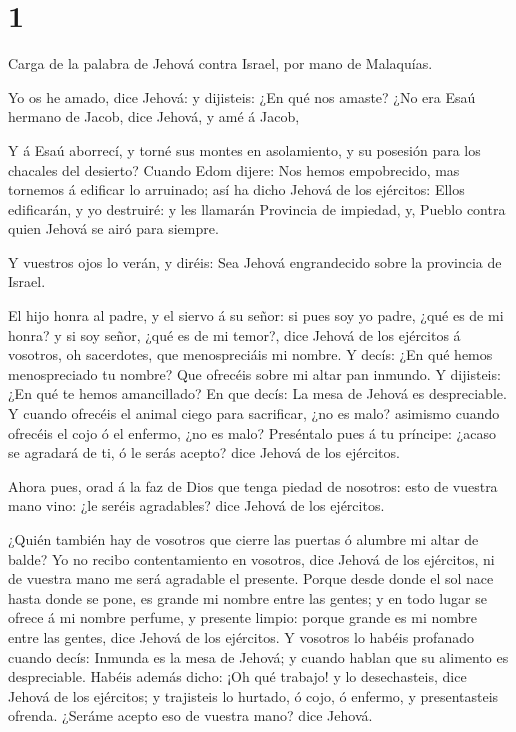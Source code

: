 \hypertarget{section}{%
\section{1}\label{section}}

 Carga de la palabra de Jehová contra Israel, por mano de
Malaquías.

 Yo os he amado, dice Jehová: y dijisteis: ¿En qué nos
amaste? ¿No era Esaú hermano de Jacob, dice Jehová, y amé á Jacob,

 Y á Esaú aborrecí, y torné sus montes en asolamiento, y su
posesión para los chacales del desierto?  Cuando Edom
dijere: Nos hemos empobrecido, mas tornemos á edificar lo arruinado; así
ha dicho Jehová de los ejércitos: Ellos edificarán, y yo destruiré: y
les llamarán Provincia de impiedad, y, Pueblo contra quien Jehová se
airó para siempre.

 Y vuestros ojos lo verán, y diréis: Sea Jehová engrandecido
sobre la provincia de Israel.

 El hijo honra al padre, y el siervo á su señor: si pues soy
yo padre, ¿qué es de mi honra? y si soy señor, ¿qué es de mi temor?,
dice Jehová de los ejércitos á vosotros, oh sacerdotes, que
menospreciáis mi nombre. Y decís: ¿En qué hemos menospreciado tu nombre?
 Que ofrecéis sobre mi altar pan inmundo. Y dijisteis: ¿En
qué te hemos amancillado? En que decís: La mesa de Jehová es
despreciable.  Y cuando ofrecéis el animal ciego para
sacrificar, ¿no es malo? asimismo cuando ofrecéis el cojo ó el enfermo,
¿no es malo? Preséntalo pues á tu príncipe: ¿acaso se agradará de ti, ó
le serás acepto? dice Jehová de los ejércitos.

 Ahora pues, orad á la faz de Dios que tenga piedad de
nosotros: esto de vuestra mano vino: ¿le seréis agradables? dice Jehová
de los ejércitos.

 ¿Quién también hay de vosotros que cierre las puertas ó
alumbre mi altar de balde? Yo no recibo contentamiento en vosotros, dice
Jehová de los ejércitos, ni de vuestra mano me será agradable el
presente.  Porque desde donde el sol nace hasta donde se
pone, es grande mi nombre entre las gentes; y en todo lugar se ofrece á
mi nombre perfume, y presente limpio: porque grande es mi nombre entre
las gentes, dice Jehová de los ejércitos.  Y vosotros lo
habéis profanado cuando decís: Inmunda es la mesa de Jehová; y cuando
hablan que su alimento es despreciable.  Habéis además
dicho: ¡Oh qué trabajo! y lo desechasteis, dice Jehová de los ejércitos;
y trajisteis lo hurtado, ó cojo, ó enfermo, y presentasteis ofrenda.
¿Seráme acepto eso de vuestra mano? dice Jehová.


